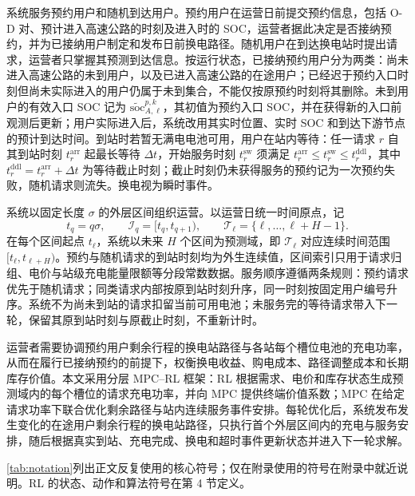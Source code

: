 \documentclass[12pt,a4paper,UTF8]{ctexart}
\begin{document}
系统服务预约用户和随机到达用户。预约用户在运营日前提交预约信息，包括 O-D 对、预计进入高速公路的时刻及进入时的 SOC，运营者据此决定是否接纳预约，并为已接纳用户制定和发布日前换电路径。随机用户在到达换电站时提出请求，运营者只掌握其预测到达信息。按运行状态，已接纳预约用户分为两类：尚未进入高速公路的未到用户，以及已进入高速公路的在途用户；已经迟于预约入口时刻但尚未实际进入的用户仍属于未到集合，不能仅按原预约时刻将其删除。未到用户的有效入口 SOC 记为 $\widetilde{\mathrm{soc}}_{A,\ell}^{p,k}$，其初值为预约入口 SOC，并在获得新的入口前观测后更新；用户实际进入后，系统改用其实时位置、实时 SOC 和到达下游节点的预计到达时间。到站时若暂无满电电池可用，用户在站内等待：任一请求 $r$ 自其到站时刻 $t_r^{\mathrm{arr}}$ 起最长等待 $\Delta t$，开始服务时刻 $t_r^{\mathrm{sw}}$ 须满足 $t_r^{\mathrm{arr}}\le t_r^{\mathrm{sw}}\le t_r^{\mathrm{ddl}}$，其中 $t_r^{\mathrm{ddl}}=t_r^{\mathrm{arr}}+\Delta t$ 为等待截止时刻；截止时刻仍未获得服务的预约记为一次预约失败，随机请求则流失。换电视为瞬时事件。

系统以固定长度 $\sigma$ 的外层区间组织运营。以运营日统一时间原点，记
\[
t_q=q\sigma,
\qquad
\mathcal I_q=[t_q,t_{q+1}),
\qquad
\mathcal T_\ell=\{\ell,\ldots,\ell+H-1\}.
\]
在每个区间起点 $t_\ell$，系统以未来 $H$ 个区间为预测域，即 $\mathcal T_\ell$ 对应连续时间范围 $[t_\ell,t_{\ell+H})$。预约与随机请求的到站时刻均为外生连续值，区间索引只用于请求归组、电价与站级充电能量限额等分段常数数据。服务顺序遵循两条规则：预约请求优先于随机请求；同类请求内部按原到站时刻升序，同一时刻按固定用户编号升序。系统不为尚未到站的请求扣留当前可用电池；未服务完的等待请求带入下一轮，保留其原到站时刻与原截止时刻，不重新计时。

运营者需要协调预约用户剩余行程的换电站路径与各站每个槽位电池的充电功率，从而在履行已接纳预约的前提下，权衡换电收益、购电成本、路径调整成本和长期库存价值。本文采用分层 MPC--RL 框架：RL 根据需求、电价和库存状态生成预测域内的每个槽位的请求充电功率，并向 MPC 提供终端价值系数；MPC 在给定请求功率下联合优化剩余路径与站内连续服务事件安排。每轮优化后，系统发布发生变化的在途用户剩余行程的换电站路径，只执行首个外层区间内的充电与服务安排，随后根据真实到站、充电完成、换电和超时事件更新状态并进入下一轮求解。

\autoref{tab:notation}列出正文反复使用的核心符号；仅在附录使用的符号在附录中就近说明。RL 的状态、动作和算法符号在第 4 节定义。
\end{document}
